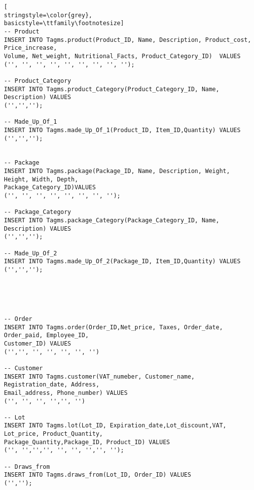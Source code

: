\begin{lstlisting}[
stringstyle=\color{grey},
basicstyle=\ttfamily\footnotesize]
-- Product
INSERT INTO Tagms.product(Product_ID, Name, Description, Product_cost, Price_increase,
Volume, Net_weight, Nutritional_Facts, Product_Category_ID)  VALUES 
('', '', '', '', '', '', '', '', '');

-- Product_Category
INSERT INTO Tagms.product_Category(Product_Category_ID, Name, Description) VALUES 
('','','');

-- Made_Up_Of_1
INSERT INTO Tagms.made_Up_Of_1(Product_ID, Item_ID,Quantity) VALUES
('','','');


-- Package
INSERT INTO Tagms.package(Package_ID, Name, Description, Weight, Height, Width, Depth, 
Package_Category_ID)VALUES
('', '', '', '', '', '', '', '');

-- Package_Category
INSERT INTO Tagms.package_Category(Package_Category_ID, Name, Description) VALUES 
('','','');

-- Made_Up_Of_2
INSERT INTO Tagms.made_Up_Of_2(Package_ID, Item_ID,Quantity) VALUES
('','','');





-- Order
INSERT INTO Tagms.order(Order_ID,Net_price, Taxes, Order_date, Order_paid, Employee_ID, 
Customer_ID) VALUES 
('','', '', '', '', '', '')

-- Customer
INSERT INTO Tagms.customer(VAT_numeber, Customer_name, Registration_date, Address, 
Email_address, Phone_number) VALUES
('', '', '', '','', '')

-- Lot
INSERT INTO Tagms.lot(Lot_ID, Expiration_date,Lot_discount,VAT, Lot_price, Product_Quantity, 
Package_Quantity,Package_ID, Product_ID) VALUES 
('', '','','', '', '', '','', '');

-- Draws_from
INSERT INTO Tagms.draws_from(Lot_ID, Order_ID) VALUES 
('','');

\end{lstlisting}
